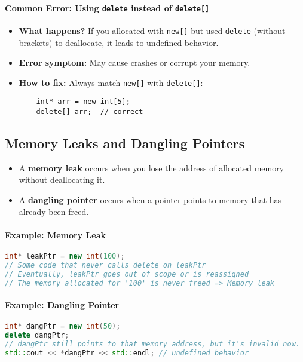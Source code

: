 \documentclass[a4paper,12pt]{article}
\begin{document}
\paragraph{Common Error: Using \texttt{delete} instead of \texttt{delete[]}}
\begin{itemize}
    \item \textbf{What happens?} If you allocated with \texttt{new[]} but used \texttt{delete} (without brackets) to deallocate, it leads to undefined behavior.
    \item \textbf{Error symptom:} May cause crashes or corrupt your memory.
    \item \textbf{How to fix:} Always match \texttt{new[]} with \texttt{delete[]}:
    \begin{lstlisting}
    int* arr = new int[5];
    delete[] arr;  // correct
    \end{lstlisting}
\end{itemize}

\subsection{Memory Leaks and Dangling Pointers}

\begin{itemize}
    \item A \textbf{memory leak} occurs when you lose the address of allocated memory without deallocating it.  
    \item A \textbf{dangling pointer} occurs when a pointer points to memory that has already been freed.
\end{itemize}

\paragraph{Example: Memory Leak}

\begin{lstlisting}[language=C++]
int* leakPtr = new int(100);
// Some code that never calls delete on leakPtr
// Eventually, leakPtr goes out of scope or is reassigned
// The memory allocated for '100' is never freed => Memory leak
\end{lstlisting}

\paragraph{Example: Dangling Pointer}

\begin{lstlisting}[language=C++]
int* dangPtr = new int(50);
delete dangPtr;
// dangPtr still points to that memory address, but it's invalid now.
std::cout << *dangPtr << std::endl; // undefined behavior
\end{lstlisting}
\end{document}
